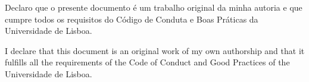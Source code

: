 

\begin{center}
    Declaro que o presente documento é um trabalho original da minha autoria e que cumpre todos os requisitos do Código de Conduta e Boas Práticas da Universidade de Lisboa.
\end{center}


\vspace*{1cm}

\begin{center}
    I declare that this document is an original work of my own authorship and that it fulfills all the requirements of the Code of Conduct and Good Practices of the Universidade de Lisboa.
\end{center}

